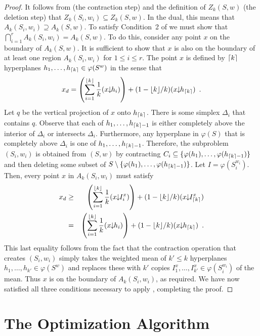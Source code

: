 \documentclass[lotsofwhite]{patmorin}
\newcommand{\drop}{\!\!\downarrow\!\!}
\newcommand{\dual}{\varphi}
\begin{document}
\begin{proof}
It follows from  (the contraction step) 
and the definition of $Z_k(S,w)$ (the deletion step)
that $Z_k(S_i,{w_i})\subseteq Z_k(S,w)$.  In the dual, this means that
$A_k(S_i,{w_i})\supseteq A_k(S,w)$.  To satisfy Condition~2 of
 we must
show that $\bigcap_{i=1}^r A_k(S_i,{w_i}) = A_k(S,w)$.  To do this,
consider any point $x$ on the boundary of $A_k(S,w)$.  It is
sufficient to show that $x$ is also on the boundary of at least one
region $A_k(S_i,{w_i})$ for $1\le i\le r$.  The point $x$ is defined
by $\left\lceil k \right\rceil$ hyperplanes $h_1,\ldots,h_{\ceil{k}}\in\dual(S^w)$ in
the sense that 
\[
   x_d=\left(\sum_{i=1}^{\floor{k}} \frac{1}{k}(x\drop h_i)\right) 
       + (1-\lfloor k\rfloor/k)(x\drop h_{\ceil{k}}) \enspace .
\]
Let $q$ be the vertical projection of $x$ onto $h_{\left\lceil k \right\rceil}$.  There
is some simplex $\Delta_i$ that contains $q$.  Observe that each of
$h_1,\ldots,h_{\left\lceil k \right\rceil-1}$ is either completely above the interior of
$\Delta_i$ or intersects $\Delta_i$.  Furthermore, any hyperplane in
$\dual(S)$ that is completely above $\Delta_i$ is one of
$h_1,\ldots,h_{\left\lceil k \right\rceil-1}$.  Therefore, the subproblem $(S_i,w_i)$ is
obtained from $(S,w)$ by contracting
$C_i\subseteq\{\dual(h_1),\ldots,\dual(h_{\ceil{k}-1})\}$ and then
deleting some subset of
$S\setminus\{\dual(h_1),\ldots,\dual(h_{\ceil{k}-1})\}$.  Let
$I=\dual(S_i^{w_i})$.  Then, every point $x$ in $A_k(S_i,w_i)$ must
satisfy
\begin{eqnarray*}
  x_d & \ge & \left(\sum_{i=1}^{\floor{k}} \frac{1}{k}(x\drop I_i^x)\right) 
       + (1-\lfloor k\rfloor/k)(x\drop I_{\ceil{k}}^x) \\
   & = & \left(\sum_{i=1}^{\floor{k}} \frac{1}{k}(x\drop h_i)\right) 
       + (1-\lfloor k\rfloor/k)(x\drop h_{\ceil{k}}) \enspace .
\end{eqnarray*}
This last equality follows from the fact that the contraction
operation that creates $(S_i,w_i)$ simply takes the weighted mean of
$k'\le k$ hyperplanes $h_1,\ldots,h_{k'}\in \dual(S^w)$ and replaces
these with $k'$ copies $I^x_1,\ldots,I^x_{k'}\in \dual(S_i^{w_i})$ of
the mean.
Thus $x$ is on the boundary of $A_k(S_i,w_i)$, as required.  We have
now satisfied all three conditions necessary to apply ,
completing the proof.
\end{proof}

\section{The Optimization Algorithm}
\end{document}
